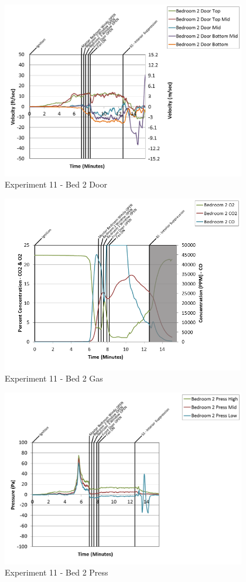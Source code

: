 \documentclass{article}
\begin{document}
\begin{appendices}
\clearpage

\begin{figure}[h!]
	\centering
	\includegraphics[height=3.05in]{0_Images/Results_Charts/Exp_11_Charts/Bed2Door.png}
	\caption{Experiment 11 - Bed 2 Door}
\end{figure}


\begin{figure}[h!]
	\centering
	\includegraphics[height=3.05in]{0_Images/Results_Charts/Exp_11_Charts/Bed2Gas.png}
	\caption{Experiment 11 - Bed 2 Gas}
\end{figure}

\clearpage

\begin{figure}[h!]
	\centering
	\includegraphics[height=3.05in]{0_Images/Results_Charts/Exp_11_Charts/Bed2Press.png}
	\caption{Experiment 11 - Bed 2 Press}
\end{figure}



\end{appendices}
\end{document}
